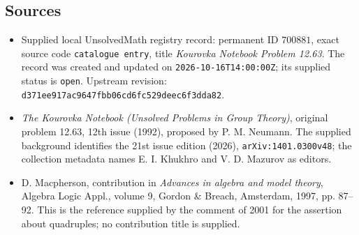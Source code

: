 \documentclass[11pt]{article}
\begin{document}
\subsection{Sources}
\begin{itemize}
\item Supplied local UnsolvedMath registry record: permanent ID \(700881\), exact source code \texttt{catalogue entry}, title \emph{Kourovka Notebook Problem 12.63}. The record was created and updated on \texttt{2026-10-16T14:00:00Z}; its supplied status is \texttt{open}. Upstream revision: \texttt{d371ee917ac9647fbb06cd6fc529deec6f3dda82}.
\item \emph{The Kourovka Notebook (Unsolved Problems in Group Theory)}, original problem 12.63, 12th issue (1992), proposed by P. M. Neumann. The supplied background identifies the 21st issue edition (2026), \texttt{arXiv:1401.0300v48}; the collection metadata names E. I. Khukhro and V. D. Mazurov as editors.
\item D. Macpherson, contribution in \emph{Advances in algebra and model theory}, Algebra Logic Appl., volume 9, Gordon \& Breach, Amsterdam, 1997, pp. 87--92. This is the reference supplied by the comment of 2001 for the assertion about quadruples; no contribution title is supplied.
\end{itemize}
\end{document}
